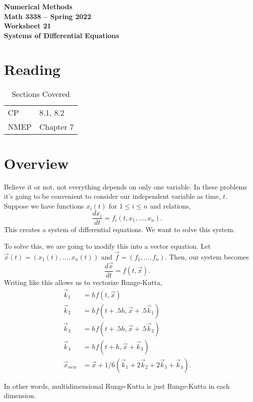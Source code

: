 \documentclass[11pt,letterpaper]{article}
\newcommand{\semester}{Spring 2022}
\begin{document}
\begin{center}
{\huge{\bf  Numerical Methods}} \\[1.5ex]
{\bf Math 3338 -- \semester}\\[1.5ex]
{\Large{\bf Worksheet 21\ \\[2ex] Systems of Differential Equations}}\\
\end{center}
\vspace{2mm}

\section{Reading}

\begin{table}[!ht]
 \centering
 \begin{tabular}{ll}
   CP &  8.1, 8.2 \\
 NMEP &  Chapter 7
 \end{tabular}
\caption{Sections Covered}
\end{table}

\section{Overview}
Believe it or not, not everything depends on only one variable. In these problems it's going 
to be convenient to consider our independent variable as time, $t$. Suppose we have functions 
$x_i(t)$ for $1\le i \le n$ and relations,
\[
 \frac{dx_i}{dt} = f_i(t,x_1,\dots,x_n).
\]
This creates a system of differential equations. We want to solve this system. 

To solve this, we are going to modify this into a vector equation. Let $\vec{x}(t) = (x_1(t),\dots,x_n(t))$
and $\vec{f} = (f_1,\dots,f_n)$. Then, our system becomes
\[
 \frac{d\vec{x}}{dt} = f(t,\vec{x}).
\]
Writing like this allows us to vectorize Runge-Kutta,
\begin{align*}
        \vec{k}_1 &= hf(t,\vec{x}) \\ 
        \vec{k}_2 &= hf(t+.5h,\vec{x}+.5\vec{k}_1) \\
        \vec{k}_3 &= hf(t+.5h,\vec{x}+.5\vec{k}_2) \\
        \vec{k}_4 &= hf(t+h,\vec{x}+\vec{k}_3) \\
        \vec{x}_{new} &= \vec{x}+1/6(\vec{k}_1+2\vec{k}_2+2\vec{k}_3+\vec{k}_4).
\end{align*}


In other words, multidimensional Runge-Kutta is just Runge-Kutta in each dimension.
\end{document}
